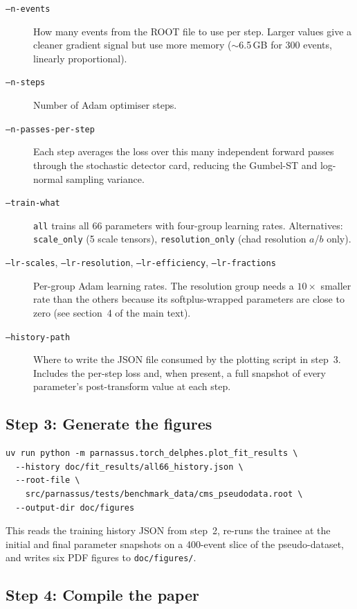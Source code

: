 \documentclass[a4paper,11pt]{article}
\begin{document}
\begin{description}
\item[\texttt{--n-events}] How many events from the ROOT file to use
  per step. Larger values give a cleaner gradient signal but use more
  memory ($\sim$6.5\,GB for 300 events, linearly proportional).
\item[\texttt{--n-steps}] Number of Adam optimiser steps.
\item[\texttt{--n-passes-per-step}] Each step averages the loss over
  this many independent forward passes through the stochastic detector
  card, reducing the Gumbel-ST and log-normal sampling variance.
\item[\texttt{--train-what}] \texttt{all} trains all 66 parameters
  with four-group learning rates. Alternatives:
  \texttt{scale\_only} (5 scale tensors), \texttt{resolution\_only}
  (chad resolution $a$/$b$ only).
\item[\texttt{--lr-scales}, \texttt{--lr-resolution},
      \texttt{--lr-efficiency}, \texttt{--lr-fractions}]
  Per-group Adam learning rates. The resolution group needs a $10\times$
  smaller rate than the others because its softplus-wrapped parameters
  are close to zero (see section~4 of the main text).
\item[\texttt{--history-path}] Where to write the JSON file consumed
  by the plotting script in step~3. Includes the per-step loss
  and, when present, a full snapshot of every parameter's post-transform
  value at each step.
\end{description}

\subsection{Step 3: Generate the figures}

\begin{verbatim}
uv run python -m parnassus.torch_delphes.plot_fit_results \
  --history doc/fit_results/all66_history.json \
  --root-file \
    src/parnassus/tests/benchmark_data/cms_pseudodata.root \
  --output-dir doc/figures
\end{verbatim}

This reads the training history JSON from step~2, re-runs the trainee
at the initial and final parameter snapshots on a 400-event slice of
the pseudo-dataset, and writes six PDF figures to
\texttt{doc/figures/}.

\subsection{Step 4: Compile the paper}
\end{document}
